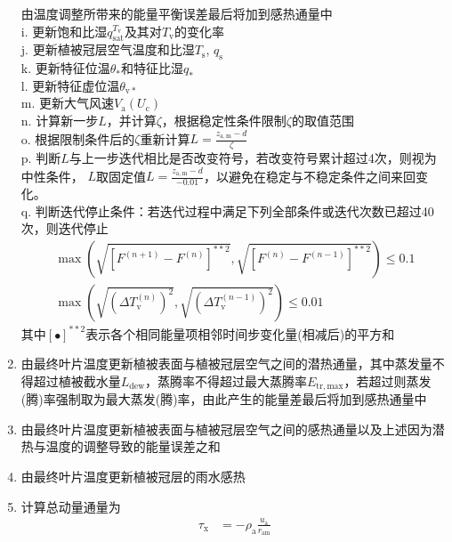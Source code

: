 \begin{enumerate}
    由温度调整所带来的能量平衡误差最后将加到感热通量中\\
    i. 更新饱和比湿$q_{\mathrm{sat}}^{T_{\mathrm v}}$及其对$T_{\mathrm v}$的变化率 \\
    j. 更新植被冠层空气温度和比湿$T_{\mathrm {s}}$, $q_{\mathrm {s}}$ \\
    k. 更新特征位温$\theta_\ast$和特征比湿$q_\ast$ \\
    l. 更新特征虚位温$\theta_{\mathrm{v\ast}}$ \\
    m. 更新大气风速$V_{\mathrm a}\left(U_{\mathrm c}\right)$ \\
    n. 计算新一步$L$，并计算$\zeta$，根据稳定性条件限制$\zeta$的取值范围 \\
    o. 根据限制条件后的$\zeta$重新计算$L=\frac{z_{\mathrm{a,m}}-d}{\zeta}$ \\
    p. 判断$L$与上一步迭代相比是否改变符号，若改变符号累计超过4次，则视为中性条件，
    $L$取固定值$L=\frac{z_{\mathrm{a,m}}-d}{-0.01}$，以避免在稳定与不稳定条件之间来回变化。\\
    q. 判断迭代停止条件：若迭代过程中满足下列全部条件或迭代次数已超过40次，则迭代停止
    \begin{equation}\label{eq:iterstop}
      \begin{array}{l}\max\left( \sqrt{\left[F^{(n+1)}-F^{(n)}\right]^{\ast\ast2}}, \sqrt{\left[F^{(n)}-F^{(n-1)}\right]^{\ast\ast2}} \right) \leqslant 0.1 \\[3.0 ex]
      \max\left( \sqrt{\left(\Delta T_{\mathrm{v}}^{(n)}\right)^{2}}, \sqrt{\left(\Delta T_{\mathrm{v}}^{(n-1)}\right)^{2}} \right) \leqslant 0.01\end{array}
    \end{equation}
    其中$\left[\bullet\right]^{\ast\ast2}$表示各个相同能量项相邻时间步变化量(相减后)的平方和
  \item 由最终叶片温度更新植被表面与植被冠层空气之间的潜热通量，其中蒸发量不得超过植被截水量$L_{\mathrm{dew}}$，蒸腾率不得超过最大蒸腾率$ E_{\mathrm{tr,max}}$，若超过则蒸发(腾)率强制取为最大蒸发(腾)率，由此产生的能量差最后将加到感热通量中
  \item 由最终叶片温度更新植被表面与植被冠层空气之间的感热通量以及上述因为潜热与温度的调整导致的能量误差之和
  \item 由最终叶片温度更新植被冠层的雨水感热
  \item 计算总动量通量为
    \begin{equation}
      \begin{aligned}
        \tau_{\mathrm{x}} &=- \rho_{\mathrm{a}} \frac{u_{\mathrm{a}}}{r_{\mathrm{a m}}} \\[1ex]

\end{aligned}
\end{equation}
\end{enumerate}
